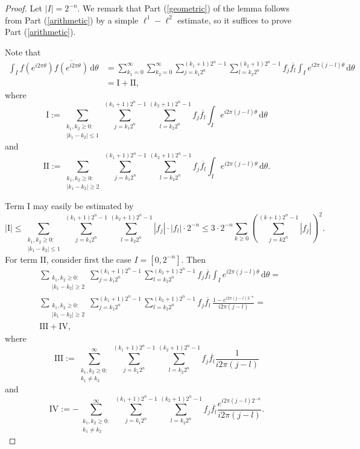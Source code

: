 \documentclass[10pt,a4paper]{amsart}
\newcommand{\II}{\mathrm{II}}
\newcommand{\I}{\mathrm{I}}
\newcommand{\dd}{\mathrm{d}}
\begin{document}
\begin{proof} Let $|I| = 2^{-n}$.
We remark that Part (\ref{geometric}) of the lemma follows from Part (\ref{arithmetic}) by a simple $\ell^1 - \ell^2$ estimate, so it suffices to prove Part (\ref{arithmetic}).

Note that
\begin{align*}
\int_I f(e^{i 2 \pi \theta})\overline{f(e^{i 2 \pi \theta})} \, \dd \theta & = \sum_{k_1 = 0}^\infty\sum_{k_2=0}^\infty \sum_{j=k_1 2^{n}}^{(k_1+1)2^{n}-1}\sum_{l=k_2 2^n}^{(k_2 +1) 2^{n}-1} f_j \overline{f_l} \int_I e ^{i 2\pi (j-l) \theta} \, \dd \theta \\
&=  \I + \II,
\end{align*}
where
\[
\I := \sum_{\substack{ k_1, k_2 \geq 0:\\ |k_1-k_2| \leq 1}} \sum_{j=k_1 2^{n}}^{(k_1+1)2^{n}-1}\sum_{l=k_2 2^n}^{(k_2 +1) 2^{n}-1} f_j \overline{f_l} \int_I e^{i 2\pi (j-l) \theta} \, \dd \theta
\]
and
\[
\II := \sum_{\substack{ k_1, k_2 \geq 0:\\ |k_1-k_2| \geq 2}} \sum_{j=k_1 2^{n}}^{(k_1+1)2^{n}-1}\sum_{l=k_2 2^n}^{(k_2 +1) 2^{n}-1} f_j \overline{f_l} \int_I e^{i 2\pi (j-l) \theta} \, \dd \theta .
\]

Term $\I$ may easily be estimated by
\[
| \I | \leq
\sum_{\substack{k_1, k_2 \geq 0:\\ |k_1-k_2| \leq 1}} \sum_{j=k_1 2^{n}}^{(k_1+1)2^{n}-1}\sum_{l=k_2 2^n}^{(k_2 +1) 2^{n}-1} | f_j | \cdot |  f_l | \cdot 2^{-n}
\leq 3 \cdot 2^{-n} \sum_{k \geq 0} \left(\sum_{j=k 2^{n}}^{(k+1)2^{n}-1} |f_j| \right)^2.
\]
For term $\II$, consider first the case $I = [0,2^{-n}]$. Then
\begin{align*}
&\sum_{\substack{k_1, k_2 \geq 0:\\ |k_1-k_2| \geq 2}} \sum_{j=k_1 2^{n}}^{(k_1+1)2^{n}-1}\sum_{l=k_2 2^n}^{(k_2 +1) 2^{n}-1} f_j \overline{f_l} \int_I e^{i 2\pi (j-l) \theta} \, \dd \theta = \\
& \sum_{\substack{k_1, k_2 \geq 0:\\ |k_1-k_2| \geq 2}}
\sum_{j=k_1 2^{n}}^{(k_1+1)2^{n}-1} \sum_{l=k_2 2^n}^{(k_2 +1) 2^{n}-1} f_j \overline{f_l} \, \frac{1 - e^{i 2 \pi (j-l) 2^{-n}}}{i 2\pi (j-l)} =  \\
&  \text{III} + \text{IV},
\end{align*}
where
\[
\text{III} :=  \sum_{\substack{ k_1, k_2 \geq  0:\\ k_1 \neq k_2} }^\infty 
\sum_{j = k_1 2^{n}}^{(k_1+1) 2^{n}-1} 
\sum_{l = k_2 2^{n}}^{(k_2+1) 2^{n}-1} f_{j} \overline{f_{l}} \frac{1}{i 2\pi ( j-l)}
\]
and
\[
\text{IV} := - \sum_{ \substack{k_1, k_2 \geq  0: \\ k_1 \neq k_2 }}^\infty 
\sum_{j = k_1 2^{n}}^{(k_1+1) 2^{n}-1} 
\sum_{l = k_2 2^{n}}^{(k_2+1) 2^{n}-1}  f_{j} \overline{f_{l}}  \frac{  e^{i 2 \pi (j-l) 2^{-n}}}{i 2\pi  ( j-l)} . 
\]


\end{proof}
\end{document}
